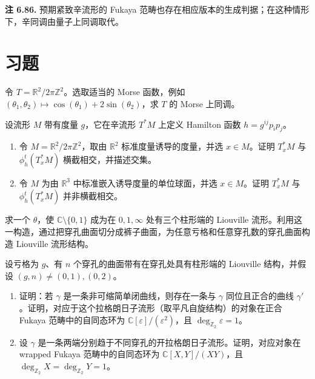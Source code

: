 \begin{note}\label{note:compact-generation-criterion}
\textbf{注 6.86.} 预期紧致辛流形的 Fukaya 范畴也存在相应版本的生成判据；在这种情形下，辛同调由量子上同调取代。
\end{note}

\section{习题}\label{sec:fukaya-exercises}
\begin{exercise}\label{exer:morse-torus}
令 $T=\mathbb R^2/2\pi\mathbb Z^2$。选取适当的 Morse 函数，例如 $(\theta_1,\theta_2)\mapsto\cos(\theta_1)+2\sin(\theta_2)$，求 $T$ 的 Morse 上同调。
\end{exercise}

\begin{exercise}\label{exer:cotangent-geodesic-flow}
设流形 $M$ 带有度量 $g$，它在辛流形 $T^*M$ 上定义 Hamilton 函数 $h=g^{ij}p_ip_j$。
\begin{enumerate}[label=(\roman*)]
  \item 令 $M=\mathbb R^2/2\pi\mathbb Z^2$，取由 $\mathbb R^2$ 标准度量诱导的度量，并选 $x\in M$。证明 $T_x^*M$ 与 $\phi_h^t(T_x^*M)$ 横截相交，并描述交集。
  \item 令 $M$ 为由 $\mathbb R^3$ 中标准嵌入诱导度量的单位球面，并选 $x\in M$。证明 $T_x^*M$ 与 $\phi_h^t(T_x^*M)$ 并非横截相交。
\end{enumerate}
\end{exercise}

\begin{exercise}\label{exer:liouville-pants}
求一个 $\theta$，使 $\mathbb C\setminus\{0,1\}$ 成为在 $0,1,\infty$ 处有三个柱形端的 Liouville 流形。利用这一构造，通过把穿孔曲面切分成裤子曲面，为任意亏格和任意穿孔数的穿孔曲面构造 Liouville 流形结构。
\end{exercise}

\begin{exercise}\label{exer:surface-fukaya-endomorphisms}
设亏格为 $g$、有 $n$ 个穿孔的曲面带有在穿孔处具有柱形端的 Liouville 结构，并假设 $(g,n)\ne(0,1),(0,2)$。
\begin{enumerate}[label=(\roman*)]
  \item 证明：若 $\gamma$ 是一条非可缩简单闭曲线，则存在一条与 $\gamma$ 同位且正合的曲线 $\gamma'$。证明，对应于这个拉格朗日子流形（取平凡自旋结构）的对象在正合 Fukaya 范畴中的自同态环为 $\mathbb C[\varepsilon]/(\varepsilon^2)$，且 $\deg_{\mathbb Z_2}\varepsilon=1$。
  \item 设 $\gamma$ 是一条两端分别趋于不同穿孔的开拉格朗日子流形。证明，对应对象在 wrapped Fukaya 范畴中的自同态环为 $\mathbb C[X,Y]/(XY)$，且 $\deg_{\mathbb Z_2}X=\deg_{\mathbb Z_2}Y=1$。
\end{enumerate}
\end{exercise}

